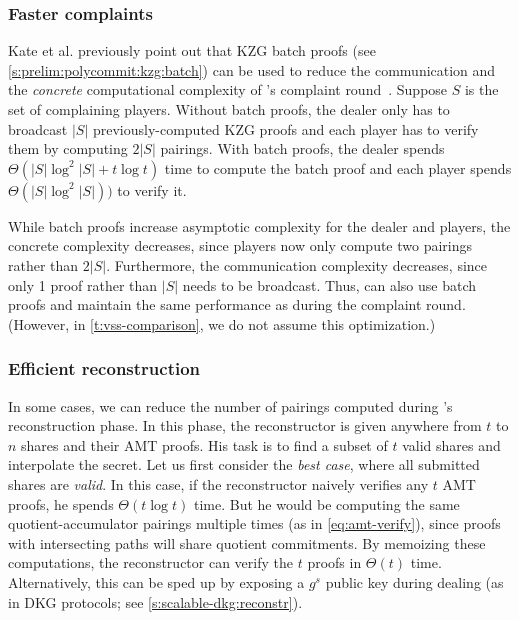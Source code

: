 \subsubsection{Faster complaints}
\label{s:scalable-vss:batch-complaints}
Kate et al. previously point out that KZG batch proofs (see \cref{s:prelim:polycommit:kzg:batch}) can be used to reduce the communication and the \textit{concrete} computational complexity of \evss's complaint round~\cite{polycommit}.
Suppose $S$ is the set of complaining players.
Without batch proofs, the dealer only has to broadcast $|S|$ previously-computed KZG proofs and each player has to verify them by computing $2|S|$ pairings.
With batch proofs, the dealer spends $\Theta(|S|\log^2{|S|}+t\log{t})$ time to compute the batch proof and each player spends $\Theta(|S|\log^2{|S|}))$ to verify it.

While batch proofs increase asymptotic complexity for the dealer and players, the concrete complexity decreases, since players now only compute two pairings rather than $2|S|$.
Furthermore, the communication complexity decreases, since only 1 proof rather than $|S|$ needs to be broadcast.
Thus, \ourvss can also use batch proofs and maintain the same performance as \evss during the complaint round.
(However, in \cref{t:vss-comparison}, we do not assume this optimization.)

\subsubsection{Efficient reconstruction}
\label{s:scalable-vss:reconstruction}
In some cases, we can reduce the number of pairings computed during \ourvss's reconstruction phase.
In this phase, the reconstructor is given anywhere from $t$ to $n$ shares and their AMT proofs.
His task is to find a subset of $t$ valid shares and interpolate the secret.
Let us first consider the \textit{best case}, where all submitted shares are \textit{valid}.
In this case, if the reconstructor naively verifies any $t$ AMT proofs, he spends $\Theta(t\log{t})$ time.
But he would be computing the same quotient-accumulator pairings multiple times (as in \cref{eq:amt-verify}), since proofs with intersecting paths will share quotient commitments.
By memoizing these computations, the reconstructor can verify the $t$ proofs in $\Theta(t)$ time.
Alternatively, this can be sped up by exposing a $g^s$ public key during dealing (as in DKG protocols; see \cref{s:scalable-dkg:reconstr}).

